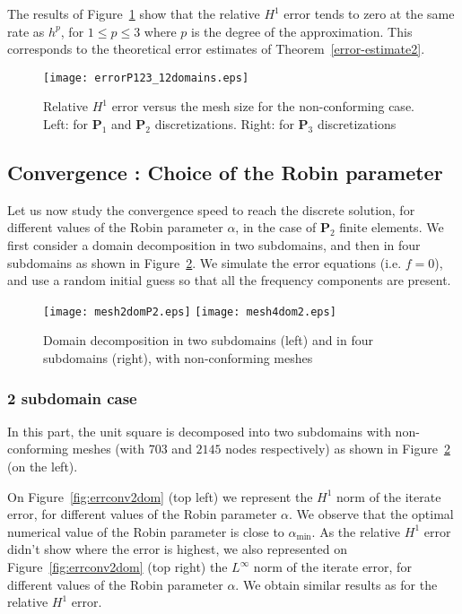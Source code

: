 \documentclass[final]{siamltex}
\begin{document}
The results of Figure~\ref{fig:errorestim12dom} show
that the relative $H^1$ error tends to zero at the same rate as 
$h^p$, for $1\le p \le 3$ where $p$ is the degree of the approximation. This corresponds to the theoretical
error estimates of Theorem~\ref{error-estimate2}.
\vspace*{-5mm}
\begin{figure}[H]
 \hspace{-25mm}
  \texttt{[image: errorP123\_12domains.eps]}\hspace{-1.5cm}
 \vspace*{-20pt}
  \caption{Relative $H^1$ error versus the mesh size for
     the non-conforming case. Left: for ${\mathbf{P}}_1$ and ${\mathbf{P}}_2$ discretizations. Right: for ${\mathbf{P}}_3$ discretizations}
  \label{fig:errorestim12dom}
\end{figure}
\subsection{Convergence : Choice of the Robin parameter}\label{sec.Robinparam}
Let us now study the convergence speed to reach the discrete solution, for
different values of the Robin parameter $\alpha$, in the case of ${\mathbf{P}}_2$ finite elements.
We first consider a domain decomposition in two subdomains, and then
in four subdomains as shown in Figure~\ref{fig:meshnc2-4dom}. We simulate the error equations (i.e. $f = 0$),
and use a random initial guess so that all the frequency components are present.
\begin{figure}[H]
  \centering
  \texttt{[image: mesh2domP2.eps]}
  \texttt{[image: mesh4dom2.eps]}
  \caption{Domain decomposition in two subdomains (left) and in four subdomains (right), with non-conforming meshes}
  \label{fig:meshnc2-4dom}
\end{figure}
\subsubsection{2 subdomain case}\label{sec.2sub}
In this part, the unit square is decomposed into two subdomains
with non-conforming meshes (with $703$ and $2145$ nodes respectively)
 as shown in Figure~\ref{fig:meshnc2-4dom} (on the left). 

On Figure~\ref{fig:errconv2dom} (top left) we represent
 the $H^1$ norm of the iterate error, for different values of the Robin 
parameter $\alpha$. We observe that
the optimal numerical value of the Robin parameter is close to $\alpha_{\text{min}}$.
As the relative $H^1$ error didn't show where the error is highest,
we also represented on Figure~\ref{fig:errconv2dom} (top right)
the $L^{\infty}$ norm of the iterate error, for different values of the Robin parameter $\alpha$.
We obtain similar results as for the relative $H^1$ error.
\end{document}
